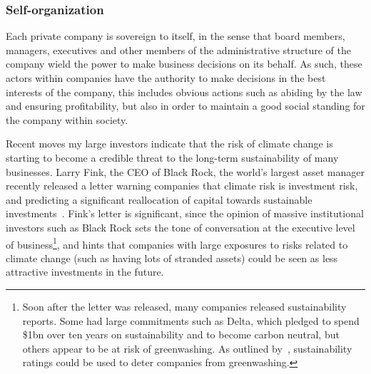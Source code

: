 
\subsubsection{Self-organization}


Each private company is sovereign to itself, in the sense that board
members, managers, executives and other members of the administrative
structure of the company wield the power to make business decisions on
its behalf. As such, these actors within companies have the authority
to make decisions in the best interests of the company, this includes
obvious actions such as abiding by the law and ensuring profitability,
but also in order to maintain a good social standing for the company
within society.


Recent moves my large investors indicate that the risk of climate
change is starting to become a credible threat to the long-term
sustainability of many businesses. Larry Fink, the CEO of Black Rock,
the world's largest asset manager recently released a letter warning
companies that climate risk is investment risk, and predicting a
significant reallocation of capital towards sustainable
investments~\citep{reshaping2020fink}. Fink's letter is significant,
since the opinion of massive institutional investors such as Black
Rock sets the tone of conversation at the executive level of
business\footnote{Soon after the letter was released, many companies
  released sustainability reports. Some had large commitments such as
  Delta, which pledged to spend \$1bn over ten years on sustainability
  and to become carbon neutral, but others appear to be at risk of
  greenwashing. As outlined by~\citep{parguel2011sustainability},
  sustainability ratings could be used to deter companies from
  greenwashing.}, and hints that companies with large exposures to
risks related to climate change (such as having lots of stranded
assets) could be seen as less attractive investments in the future.


